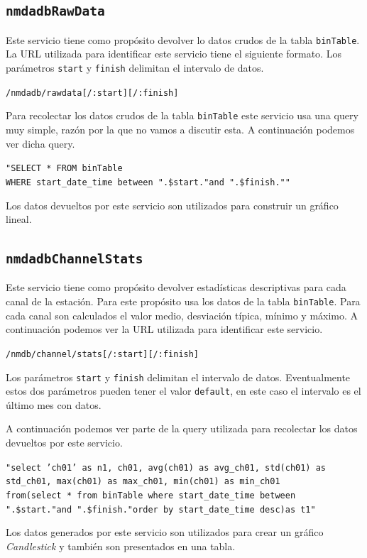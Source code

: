 {	\subsection{\texttt{nmdadbRawData}}
		Este servicio tiene como propósito devolver lo datos crudos de la tabla \texttt{binTable}. La URL utilizada para identificar este
		servicio tiene el siguiente formato. Los parámetros \texttt{start} y \texttt{finish} delimitan el intervalo de datos.
	  		\begin{center} \texttt{/nmdadb/rawdata[/:start][/:finish]}  \end{center} 
		Para recolectar los datos crudos de la tabla \texttt{binTable} este servicio usa una query muy simple, razón por la que no vamos a
		discutir esta. A continuación podemos ver dicha query.
	  		\begin{center} \texttt{"SELECT * FROM binTable 
			  		\\	WHERE start\_date\_time between \cc".\$start."\cc and \cc".\$finish."\cc"}
			\end{center} 
		Los datos devueltos por este servicio son utilizados para construir un gráfico lineal.
	\subsection{\texttt{nmdadbChannelStats}}
		Este servicio tiene como propósito devolver estadísticas descriptivas para cada canal de la estación. Para este propósito usa los
		datos de la tabla \texttt{binTable}. Para cada canal son calculados el valor medio, desviación típica, mínimo y máximo. A continuación
		podemos ver la URL utilizada para identificar este servicio.
	  		\begin{center} \texttt{/nmdb/channel/stats[/:start][/:finish]}  \end{center} 
		Los parámetros \texttt{start} y \texttt{finish} delimitan el intervalo de datos. Eventualmente estos dos parámetros pueden tener el
		valor \texttt{default}, en este caso el intervalo es el último mes con datos. 
		\par
		A continuación podemos ver parte de la query utilizada para recolectar los datos devueltos por este servicio.
	  		\begin{center} \texttt{"select 'ch01' as n1, ch01, avg(ch01) as avg\_ch01, std(ch01) as std\_ch01, max(ch01) as max\_ch01, min(ch01) as min\_ch01
			  		\\	from(select * from  binTable where start\_date\_time between \cc".\$start."\cc and \cc".\$finish."\cc order by start\_date\_time desc)as t1"}
			\end{center} 
		Los datos generados por este servicio son utilizados para crear un gráfico \emph{Candlestick} y también son presentados en una tabla.
}
